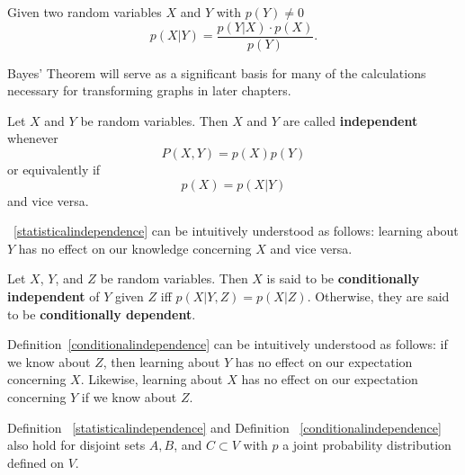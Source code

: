 \begin{theorem} Given two random variables $X$ and $Y$ with $p(Y) \neq 0$
$$p(X|Y) = \frac{p(Y|X) \cdot p(X)}{p(Y)}.$$
\end{theorem}

\begin{remark}
Bayes' Theorem will serve as a significant basis for many of the calculations necessary for transforming graphs in later chapters. 
\end{remark}

\begin{definition}\label{statisticalindependence}
Let $X$ and $Y$ be random variables. Then $X$ and $Y$ are called \textbf{independent} whenever 
$$P(X,Y) = p(X)p(Y)$$ 
or equivalently if
$$ p(X) = p(X|Y)$$
and vice versa.
\end{definition}

\begin{remark}
~\ref{statisticalindependence} can be intuitively understood as follows: learning about $Y$ has no effect on our knowledge concerning $X$ and vice versa.
\end{remark}

\begin{definition}\label{conditionalindependence} 
Let $X$, $Y$, and $Z$ be random variables. Then $X$ is said to be \textbf{conditionally independent} of $Y$ given $Z$ iff $p(X|Y,Z) =p(X|Z)$.
Otherwise, they are said to be \textbf{conditionally dependent}. 
\end{definition}

\begin{remark}
Definition~\ref{conditionalindependence} can be intuitively understood as follows: if we know about $Z$, then learning about $Y$ has no effect on our expectation concerning $X$. Likewise, learning about $X$ has no effect on our expectation concerning $Y$ if we know about $Z$. 
\end{remark} 

\begin{remark} Definition ~\ref{statisticalindependence} and Definition ~\ref{conditionalindependence} also hold for disjoint sets $A,B$, and $C \subset V$ with $p$ a joint probability distribution defined on $V$. 
\end{remark}

